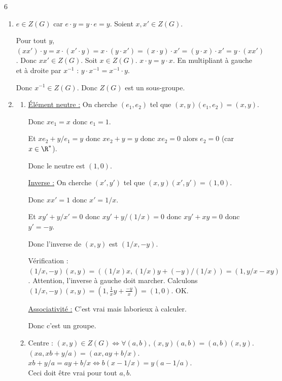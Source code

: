 \begin{correction}{6}
\begin{enumerate}
    \item $e \in Z(G)$ car $e \cdot y=y \cdot e=y$.
    Soient $x, x' \in Z(G)$.

    Pour tout $y$, $(xx') \cdot y = x\cdot(x'\cdot y) = x\cdot(y\cdot x') = (x\cdot y)\cdot x' = (y\cdot x)\cdot x' = y\cdot(xx')$.
    Donc $xx' \in Z(G)$.
    Soit $x \in Z(G)$. $x\cdot y=y\cdot x$. En multipliant à gauche et à droite par $x^{-1}$ : $y\cdot x^{-1} = x^{-1} \cdot y$.

    Donc $x^{-1} \in Z(G)$. Donc $Z(G)$ est un sous-groupe.

    \item
    \begin{enumerate}
    \item
        \uline{Élément neutre :} On cherche $(e_1, e_2)$ tel que $(x,y)(e_1,e_2)=(x,y)$.
        
        Donc $x e_1 = x$ donc $e_1=1$.
        
        Et $x e_2 + y/e_1 = y$ donc $x e_2 + y = y$ donc $x e_2 = 0$ alors $e_2=0$ (car $x \in \R^*$).

        Donc le neutre est $(1,0)$.

        \uline{Inverse :} On cherche $(x',y')$ tel que $(x,y)(x',y')=(1,0)$.
        
        Donc $xx'=1$ donc $x' = 1/x$.
        
        Et $xy' + y/x' = 0$ donc $xy' + y/(1/x) = 0$ donc $xy' + xy = 0$ donc $y' = -y$.

        Donc l'inverse de $(x,y)$ est $(1/x, -y)$.

        Vérification : $(1/x, -y)(x,y) = ( (1/x)x, (1/x)y + (-y)/(1/x) ) = (1, y/x - xy)$. Attention, l'inverse à gauche doit marcher.
        Calculons $(1/x, -y)(x,y) = (1, \frac{1}{x}y + \frac{-y}{x}) = (1,0)$. OK.

        \uline{Associativité :} C'est vrai mais laborieux à calculer.

        Donc c'est un groupe.
    \item 
        Centre : $(x,y) \in Z(G) \iff \forall (a,b), (x,y)(a,b) = (a,b)(x,y)$. \\
        $(xa, xb + y/a) = (ax, ay + b/x)$. \\
        $xb + y/a = ay + b/x \iff b(x - 1/x) = y(a - 1/a)$. \\
        Ceci doit être vrai pour tout $a,b$.


\end{enumerate}
\end{enumerate}
\end{correction}
